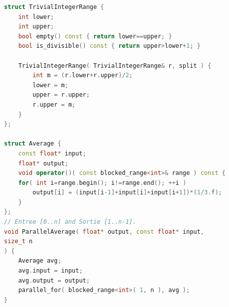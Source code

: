 \documentclass[oneside]{book}
\begin{document}
\begin{lstlisting}[language=C++]
struct TrivialIntegerRange {
	int lower;
	int upper;
	bool empty() const { return lower==upper; }
	bool is_divisible() const { return upper>lower+1; }
	
	TrivialIntegerRange( TrivialIntegerRange& r, split ) {
		int m = (r.lower+r.upper)/2;
		lower = m;
		upper = r.upper;
		r.upper = m;
	}
};

struct Average {
	const float* input;
	float* output;
	void operator()( const blocked_range<int>& range ) const {
	for( int i=range.begin(); i!=range.end(); ++i )
		output[i] = (input[i-1]+input[i]+input[i+1])*(1/3.f);
	}	
};
// Entree [0..n] and Sortie [1..n-1].
void ParallelAverage( float* output, const float* input,
size_t n
) {
	Average avg;
	avg.input = input;
	avg.output = output;
	parallel_for( blocked_range<int>( 1, n ), avg );
}

\end{lstlisting}
\end{document}
